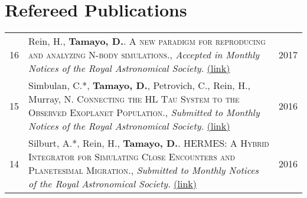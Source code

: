 \documentclass[10pt]{article} %
\begin{document}
{%




\section{Refereed Publications}

\begin{tabular}{>{\hfill}r|p{14.3cm}l}

16 & Rein, H., {\bf Tamayo, D.}. \textsc{A new paradigm for reproducing and analyzing N-body simulations.}, {\it Accepted in Monthly Notices of the Royal Astronomical Society.} \href{http://cita.utoronto.ca/~dtamayo/nbody.pdf}{(link)} & 2017 \\

15 & Simbulan, C.*, {\bf Tamayo, D.}, Petrovich, C., Rein, H., Murray, N. \textsc{Connecting the HL Tau System to the Observed Exoplanet Population.}, {\it Submitted to Monthly Notices of the Royal Astronomical Society.} \href{http://cita.utoronto.ca/~dtamayo/hltau.pdf}{(link)} & 2016 \\

14 & Silburt, A.*, Rein, H., {\bf Tamayo, D.}. \textsc{HERMES: A Hybrid Integrator for Simulating Close Encounters and Planetesimal Migration.}, {\it Submitted to Monthly Notices of the Royal Astronomical Society.} \href{http://cita.utoronto.ca/~dtamayo/hermes.pdf}{(link)} & 2016 \\


\end{tabular}}
\end{document}
